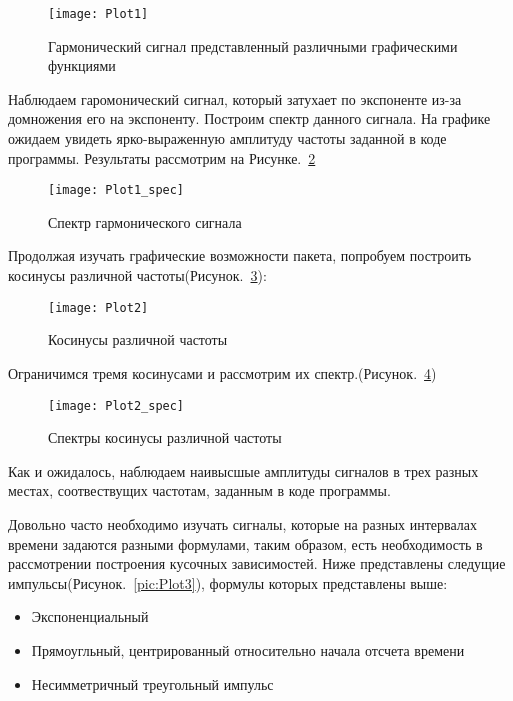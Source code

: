 \begin{figure}[H]
	\begin{center}
		\texttt{[image: Plot1]}
		\caption{Гармонический сигнал представленный различными графическими функциями} 
		\label{pic:Plot1} %
	\end{center}
\end{figure}
Наблюдаем гаромонический сигнал, который затухает по экспоненте из-за домножения его на экспоненту. Построим спектр данного сигнала. На графике ожидаем увидеть ярко-выраженную амплитуду частоты заданной в коде программы. Результаты рассмотрим на Рисунке.~\ref{pic:Plot1_spec}
\begin{figure}[H]
	\begin{center}
		\texttt{[image: Plot1\_spec]}
		\caption{Спектр гармонического сигнала} 
		\label{pic:Plot1_spec} %
	\end{center}
\end{figure}

Продолжая изучать графические возможности пакета, попробуем построить косинусы различной частоты(Рисунок.~\ref{pic:Plot2}):


\parindent=1cm %

\begin{figure}[H]
	\begin{center}
		\texttt{[image: Plot2]}
		\caption{Косинусы различной частоты} 
		\label{pic:Plot2} %
	\end{center}
\end{figure}
Ограничимся тремя косинусами и рассмотрим их спектр.(Рисунок.~\ref{pic:Plot2_spec})
\begin{figure}[H]
	\begin{center}
		\texttt{[image: Plot2\_spec]}
		\caption{Спектры косинусы различной частоты} 
		\label{pic:Plot2_spec} %
	\end{center}
\end{figure}

Как и ожидалось, наблюдаем наивысшые амплитуды сигналов в трех разных местах, соотвествущих частотам, заданным в коде программы.

Довольно часто необходимо изучать сигналы, которые на разных интервалах времени задаются разными формулами, таким образом, есть необходимость в  рассмотрении построения кусочных зависимостей. Ниже представлены следущие импульсы(Рисунок.~\ref{pic:Plot3}), формулы которых представлены выше:
\begin{itemize}
\item Экспоненциальный
\item Прямоугльный, центрированный относительно начала отсчета времени
\item Несимметричный треугольный импульс
\end{itemize}

